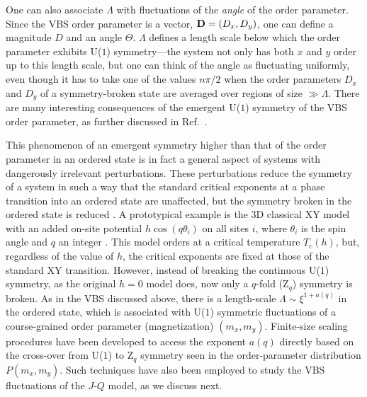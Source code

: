 \documentclass[range]{ar2e}
\begin{document}
One can also associate $\Lambda$ with fluctuations of the {\it angle} of the order parameter. Since the VBS order parameter is a vector, ${\bf D}= (D_x,D_y)$, 
one can define a magnitude $D$ and an angle $\Theta$. $\Lambda$ defines a length scale below which the order parameter exhibits U($1$) symmetry---the system
not only has both $x$ and $y$ order up to this length scale, but one can think of the angle as fluctuating uniformly, even though it has to take one of the 
values $n\pi/2$ when the order parameters $D_x$ and $D_y$ of a symmetry-broken state are averaged over regions of size $\gg \Lambda$. There are many interesting 
consequences of the emergent U($1$) symmetry of the VBS order parameter, as further discussed in Ref.~\cite{Sandvik12}.

This phenomenon of an emergent symmetry higher than that of the order parameter in an ordered state is in fact a general aspect of systems with 
dangerously irrelevant perturbations. These perturbations reduce the symmetry of a system in such a way that the standard critical exponents 
at a phase transition into an ordered state are unaffected, but the symmetry broken in the ordered state is reduced \cite{Jose77,Oshikawa00}. A 
prototypical example is the 3D classical XY model with an added on-site potential $h\cos(q\theta_i)$ on all sites $i$, where $\theta_i$ is the spin 
angle and $q$ an integer \cite{Carmona00}. This model orders at a critical temperature $T_c(h)$, but, regardless of the value of $h$, the critical exponents 
are fixed at those of the standard XY transition. However, instead of breaking the continuous U($1$) symmetry, as the original $h=0$ model does, 
now only a $q$-fold (Z$_q$) symmetry is broken. As in the VBS discussed above, there is a length-scale $\Lambda \sim \xi^{1+a(q)}$ in the ordered state, which 
is associated with U($1$) symmetric fluctuations of a course-grained order parameter (magnetization) $(m_x,m_y)$. Finite-size scaling procedures have been 
developed \cite{Lou07} to access the exponent $a(q)$ directly based on the cross-over from U($1$) to Z$_q$ symmetry seen in the order-parameter distribution 
$P(m_x,m_y)$. Such techniques have also been employed to study the VBS fluctuations of the $J$-$Q$ model, as we discuss next.
\end{document}
